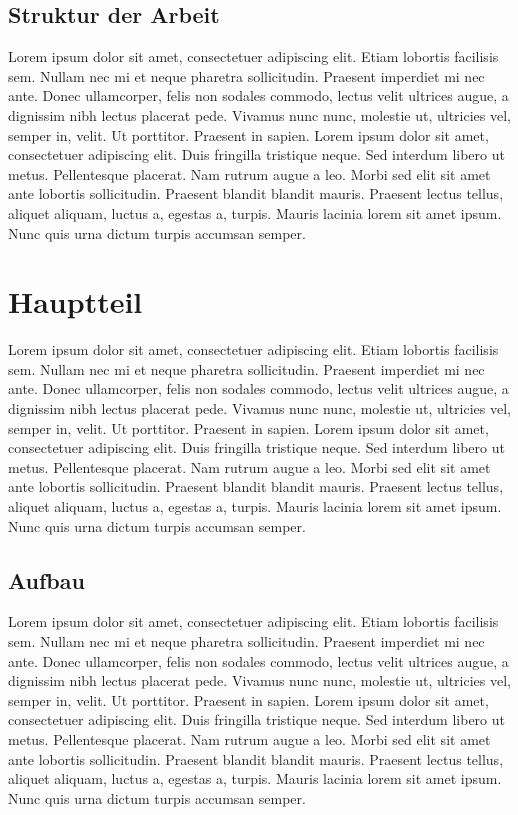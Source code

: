 \documentclass[footmark=none]{tubaf-thesis}
\begin{document}
    \section{Struktur der Arbeit}
    Lorem ipsum dolor sit amet, consectetuer adipiscing elit. Etiam lobortis facilisis sem.
    Nullam nec mi et neque pharetra sollicitudin. Praesent imperdiet mi nec ante. Donec
    ullamcorper, felis non sodales commodo, lectus velit ultrices augue, a dignissim nibh
    lectus placerat pede. Vivamus nunc nunc, molestie ut, ultricies vel, semper in, velit. Ut
    porttitor. Praesent in sapien. Lorem ipsum dolor sit amet, consectetuer adipiscing elit.
    Duis fringilla tristique neque. Sed interdum libero ut metus. Pellentesque placerat. Nam
    rutrum augue a leo. Morbi sed elit sit amet ante lobortis sollicitudin. Praesent blandit
    blandit mauris. Praesent lectus tellus, aliquet aliquam, luctus a, egestas a, turpis. Mauris
    lacinia lorem sit amet ipsum. Nunc quis urna dictum turpis accumsan semper.

    \chapter{Hauptteil}
    Lorem ipsum dolor sit amet, consectetuer adipiscing elit. Etiam lobortis facilisis sem.
    Nullam nec mi et neque pharetra sollicitudin. Praesent imperdiet mi nec ante. Donec
    ullamcorper, felis non sodales commodo, lectus velit ultrices augue, a dignissim nibh
    lectus placerat pede. Vivamus nunc nunc, molestie ut, ultricies vel, semper in, velit. \cite[100]{Bishop2006}
    Ut porttitor. Praesent in sapien. Lorem ipsum dolor sit amet, consectetuer adipiscing elit.
    Duis fringilla tristique neque. Sed interdum libero ut metus. Pellentesque placerat. Nam
    rutrum augue a leo. Morbi sed elit sit amet ante lobortis sollicitudin. Praesent blandit
    blandit mauris. Praesent lectus tellus, aliquet aliquam, luctus a, egestas a, turpis. Mauris
    lacinia lorem sit amet ipsum. Nunc quis urna dictum turpis accumsan semper.
    
    \section{Aufbau}
    Lorem ipsum dolor sit amet, consectetuer adipiscing elit. Etiam lobortis facilisis sem.
    Nullam nec mi et neque pharetra sollicitudin. Praesent imperdiet mi nec ante. Donec
    ullamcorper, felis non sodales commodo, lectus velit ultrices augue, a dignissim nibh
    lectus placerat pede. Vivamus nunc nunc, molestie ut, ultricies vel, semper in, velit. Ut
    porttitor. Praesent in sapien. Lorem ipsum dolor sit amet, consectetuer adipiscing elit.
    Duis fringilla tristique neque. \cite{Gunther2019,Lösch2018a} Sed interdum libero ut metus. 
    Pellentesque placerat. Nam rutrum augue a leo. Morbi sed elit sit amet ante lobortis sollicitudin. 
    Praesent blandit blandit mauris. Praesent lectus tellus, aliquet aliquam, luctus a, egestas a, 
    turpis. Mauris lacinia lorem sit amet ipsum. Nunc quis urna dictum turpis accumsan semper.
\end{document}
